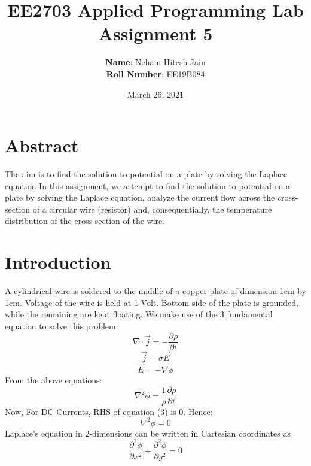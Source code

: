 \documentclass{article}
\title{EE2703 Applied Programming Lab \\ Assignment 5}
\author{
  \textbf{Name}: Neham Hitesh Jain\\
  \textbf{Roll Number}: EE19B084
}\date{March 26, 2021}
\begin{document}
\maketitle
\newpage

\section{Abstract}
The aim is to find the solution to potential on a plate by solving the Laplace equation
In this assignment, we attempt to find the solution to potential on a plate by solving the Laplace equation,
 analyze the current flow across the cross-section of a circular wire (resistor) and, consequentially, the temperature
distribution of the cross section of the wire.


\section{Introduction}
A  cylindrical wire is soldered to the middle of a copper plate of dimension 1cm by 1cm. Voltage of the wire is held at 1 Volt.  
Bottom side of the plate is grounded, while the remaining are kept floating.
\newline \newline
We make use of the 3 fundamental equation to solve this problem:
\newline
\begin{equation}
    \nabla \cdot \vec{j} = - \frac{\partial\rho}{\partial t}
\end{equation}
\begin{equation}
    \vec{j} = \sigma\vec{E}
\end{equation}
\begin{equation}
    \vec{E} = -\nabla\phi
\end{equation}
From the above equations:
\begin{equation}
    \nabla^2 \phi =  \frac{1}{\rho}\frac{\partial\rho}{\partial t}
\end{equation}
Now, For DC Currents, RHS of equation (3) is 0. Hence:
\begin{equation}
    \label{eqn(5)}
    \nabla^2 \phi =  0
\end{equation}
Laplace's equation in 2-dimensions can  be written in Cartesian coordinates as 
\begin{equation}
    \label{eqn(6)}
    \frac{\partial^2 \phi}{\partial x^2} + \frac{\partial^2 \phi}{\partial y^2} = 0
\end{equation}
\end{document}

